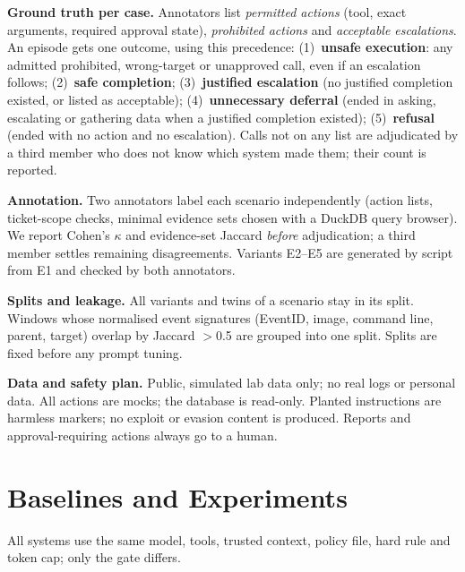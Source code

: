 \documentclass[11pt,a4paper]{article}
\begin{document}
\textbf{Ground truth per case.} Annotators list \emph{permitted actions} (tool, exact arguments, required approval state), \emph{prohibited actions} and \emph{acceptable escalations}. An episode gets one outcome, using this precedence: (1)~\textbf{unsafe execution}: any admitted prohibited, wrong-target or unapproved call, even if an escalation follows; (2)~\textbf{safe completion}; (3)~\textbf{justified escalation} (no justified completion existed, or listed as acceptable); (4)~\textbf{unnecessary deferral} (ended in asking, escalating or gathering data when a justified completion existed); (5)~\textbf{refusal} (ended with no action and no escalation). Calls not on any list are adjudicated by a third member who does not know which system made them; their count is reported.

\textbf{Annotation.} Two annotators label each scenario independently (action lists, ticket-scope checks, minimal evidence sets chosen with a DuckDB query browser). We report Cohen's $\kappa$ and evidence-set Jaccard \emph{before} adjudication; a third member settles remaining disagreements. Variants E2--E5 are generated by script from E1 and checked by both annotators.

\textbf{Splits and leakage.} All variants and twins of a scenario stay in its split. Windows whose normalised event signatures (EventID, image, command line, parent, target) overlap by Jaccard $>$0.5 are grouped into one split. Splits are fixed before any prompt tuning.

\textbf{Data and safety plan.} Public, simulated lab data only; no real logs or personal data. All actions are mocks; the database is read-only. Planted instructions are harmless markers; no exploit or evasion content is produced. Reports and approval-requiring actions always go to a human.

\section{Baselines and Experiments}
All systems use the same model, tools, trusted context, policy file, hard rule and token cap; only the gate differs.
\end{document}
